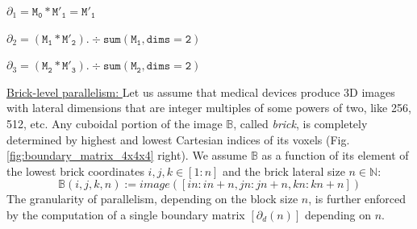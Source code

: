 \documentclass{article}
\newcommand{\B}{\mathbb{B}}
\newcommand{\N}{\mathbb{N}}
\begin{document}
$\partial_1 =  \mathtt{M_0} * \mathtt{M'_1} = \mathtt{M'_1}$

$\partial_2 =  \left(\mathtt{M_1} * \mathtt{M'_2}\right) .\div \mathtt{sum(M_1, dims=2)}$

$\partial_3 =  \left(\mathtt{M_2} * \mathtt{M'_3}\right) .\div \mathtt{sum(M_2, dims=2)}$




\vspace{10pt}
\noindent\underline{
Brick-level parallelism:
}\vspace{0.2em}\newline 
Let us assume that medical devices produce 3D images with lateral dimensions that are integer multiples of some powers of two, like 256, 512, etc.
Any cuboidal portion of the image 
$\B$, called \emph{brick},
is completely determined by highest and lowest Cartesian indices of its voxels (Fig. \ref{fig:boundary_matrix_4x4x4} right).
We assume 
$\B$ as a function of its element of the  lowest  brick coordinates $i,j,k\in \left[1:n\right]$ and 
the brick lateral size $n\in\N$:
\[
\B(i,j,k,n) := image([in:in+n, jn:jn+n, kn:kn+n]) 
\]
The granularity of parallelism, depending on the block size $n$, is further enforced by the computation of a single boundary matrix $[\partial_d(n)]$ depending on $n$.
\end{document}
